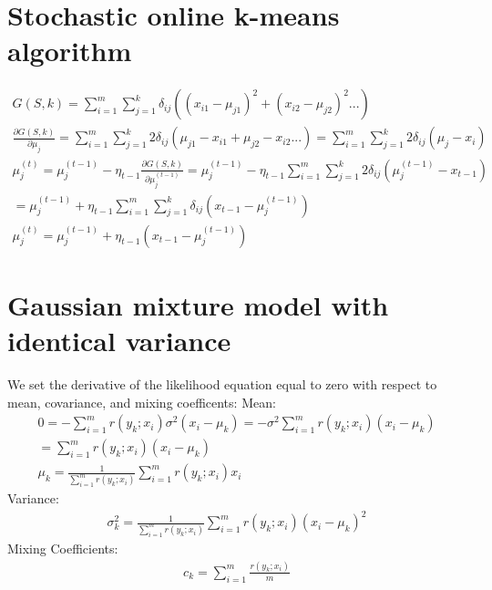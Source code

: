 \documentclass{article}
\begin{document}
\section{Stochastic online k-means algorithm}
\begin{equation}
\begin{split}
G(S,k) = \sum_{i=1}^{m} \sum_{j=1}^{k}\delta_{ij}((x_{i1}-\mu_{j1})^2 + (x_{i2}-\mu_{j2})^2...) \\
\frac{\partial G(S,k)}{\partial \mu_j} = \sum_{i=1}^{m} \sum_{j=1}^{k}2\delta_{ij}(\mu_{j1} - x_{i1} + \mu_{j2} - x_{i2}...) = \sum_{i=1}^{m} \sum_{j=1}^{k}2\delta_{ij}(\mu_j - x_i) \\ 
\mu_j^{(t)} = \mu_j^{(t-1)} - \eta_{t-1} \frac{\partial G(S,k)}{\partial \mu_j^{(t-1)}} =  \mu_j^{(t-1)} - \eta_{t-1} \sum_{i=1}^{m} \sum_{j=1}^{k}2\delta_{ij}(\mu_j^{(t-1)} - x_{t-1}) \\
= \mu_j^{(t-1)} + \eta_{t-1} \sum_{i=1}^{m} \sum_{j=1}^{k}\delta_{ij}(x_{t-1} - \mu_j^{(t-1)} ) \\
\mu_j^{(t)} =  \mu_j^{(t-1)} + \eta_{t-1} (x_{t-1} - \mu_j^{(t-1)} )
\end{split}
\end{equation}

\section{Gaussian mixture model with identical variance}
We set the derivative of the likelihood equation equal to zero with respect to mean, covariance, and mixing coefficents:
Mean:
\begin{equation}
\begin{split}
0 = -\sum_{i=1}^{m}r(y_k;x_i) \sigma^2 (x_i - \mu_k) = -\sigma^2 \sum_{i=1}^{m}r(y_k;x_i)  (x_i - \mu_k) \\
= \sum_{i=1}^{m}r(y_k;x_i)  (x_i - \mu_k) \\ 
\mu_k = \frac{1}{\sum_{i=1}^{m}r(y_k;x_i)}\sum_{i=1}^{m}r(y_k;x_i) x_i
\end{split}
\end{equation}
Variance:
\begin{equation}
\begin{split}
\sigma^2_k = \frac{1}{\sum_{i=1}^{m}r(y_k;x_i)}\sum_{i=1}^{m}r(y_k;x_i) (x_i-\mu_k)^2
\end{split}
\end{equation}
Mixing Coefficients:
\begin{equation}
\begin{split}
c_k = \sum_{i=1}^{m}\frac{r(y_k;x_i)}{m}
\end{split}
\end{equation}
\end{document}
